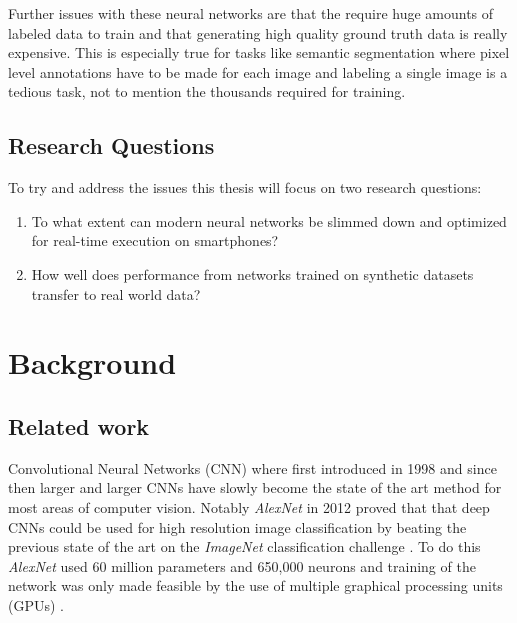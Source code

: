 \documentclass{kththesis}
\newcommand{\bibentry}[1]{\parencite{#1}}
\begin{document}
Further issues with these neural networks are that the require huge amounts of
labeled data to train and that generating high quality ground truth data is
really expensive. This is especially true for tasks like semantic segmentation
where pixel level annotations have to be made for each image and labeling a
single image is a tedious task, not to mention the thousands required for
training. 

\section{Research Questions}
To try and address the issues this thesis will focus on two research questions:
\begin{enumerate}
\item To what extent can modern neural networks be slimmed down and optimized for
  real-time execution on smartphones?
\item How well does performance from networks trained on synthetic datasets
  transfer to real world data? 
\end{enumerate}
  
\chapter{Background}
\section{Related work}
Convolutional Neural Networks (CNN) where first introduced in 1998
\bibentry{lecun1998gradient} and since then larger and larger CNNs have slowly
become the state of the art method for most areas of computer vision. Notably
\emph{AlexNet} \bibentry{krizhevsky2012imagenet} in 2012 proved that that deep
CNNs could be used for high resolution image classification by beating the
previous state of the art \bibentry{sanchez2011high} on the \emph{ImageNet}
classification challenge \bibentry{deng2009imagenet}. To do this \emph{AlexNet}
used 60 million parameters and 650,000 neurons and training of the network was
only made feasible by the use of multiple graphical processing units (GPUs)
\bibentry{krizhevsky2012imagenet}.
\end{document}
